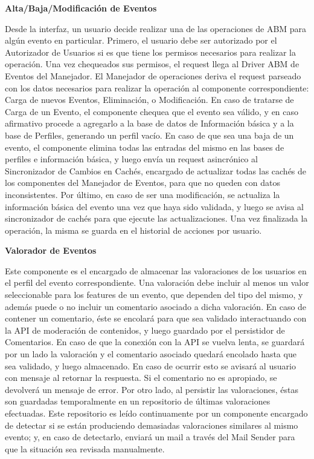 \textbf{Alta/Baja/Modificación de Eventos}

Desde la interfaz, un usuario decide realizar una de las operaciones de ABM para algún evento en particular. Primero, el usuario debe ser autorizado por el Autorizador de Usuarios si es que tiene los permisos necesarios para realizar la operación. Una vez chequeados sus permisos, el request llega al Driver ABM de Eventos del Manejador. El Manejador de operaciones deriva el request parseado con los datos necesarios para realizar la operación al componente correspondiente: Carga de nuevos Eventos, Eliminación, o Modificación.
En caso de tratarse de Carga de un Evento, el componente chequea que el evento sea válido, y en caso afirmativo procede a agregarlo a la base de datos de Información básica y a la base de Perfiles, generando un perfil vacío.
En caso de que sea una baja de un evento, el componente elimina todas las entradas del mismo en las bases de perfiles e información básica, y luego envía un request asincrónico al Sincronizador de Cambios en Cachés, encargado de actualizar todas las cachés de los componentes del Manejador de Eventos, para que no queden con datos inconsistentes.
Por último, en caso de ser una modificación, se actualiza la información básica del evento una vez que haya sido validada, y luego se avisa al sincronizador de cachés para que ejecute las actualizaciones.
Una vez finalizada la operación, la misma se guarda en el historial de acciones por usuario.

\textbf{Valorador de Eventos}

Este componente es el encargado de almacenar las valoraciones de los usuarios en el perfil del evento correspondiente. Una valoración debe incluir al menos un valor seleccionable para los features de un evento, que dependen del tipo del mismo, y además puede o no incluir un comentario asociado a dicha valoración. En caso de contener un comentario, éste se encolará para que sea validado interactuando con la API de moderación de contenidos, y luego guardado por el persistidor de Comentarios. En caso de que la conexión con la API se vuelva lenta, se guardará por un lado la valoración y el comentario asociado quedará encolado hasta que sea validado, y luego almacenado. En caso de ocurrir esto se avisará al usuario con mensaje al retornar la respuesta. Si el comentario no es apropiado, se devolverá un mensaje de error. Por otro lado, al persistir las valoraciones, éstas son guardadas temporalmente en un repositorio de últimas valoraciones efectuadas. Este repositorio es leído continuamente por un componente encargado de detectar si se están produciendo demasiadas valoraciones similares al mismo evento; y, en caso de detectarlo, enviará un mail a través del Mail Sender para que la situación sea revisada manualmente.

